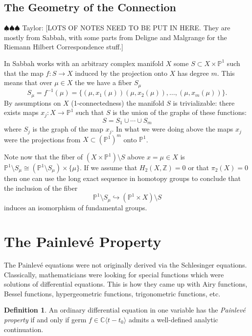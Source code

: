 \documentclass[12pt]{book}
\newcommand{\taylor}[1]{{\color{blue} \sf $\spadesuit\spadesuit\spadesuit$ Taylor: [#1]}}
\numberwithin{equation}{section}
\theoremstyle{definition}
\newtheorem{definition}[theorem]{Definition}
\theoremstyle{remark}
\newcommand{\ZZ}{\mathbb{Z}}
\newcommand{\CC}{\mathbb{C}}
\newcommand{\PP}{\mathbb{P}}
\begin{document}
\subsection{The Geometry of the Connection}

\taylor{LOTS OF NOTES NEED TO BE PUT IN HERE. They are mostly from Sabbah, with some parts from Deligne and Malgrange for the Riemann Hilbert Correspondence stuff.}

In \cite[VI, \S1, pg 192]{Sabbah2007} Sabbah works with an arbitrary complex manifold $X$ some $S \subset X\times \PP^1$ such that the map $f:S \to X$ induced by the projection onto $X$ has degree $m$. 
This means that over $\mu \in X$ the we have a fiber $S_{\mu}$
$$S_{\mu} = f^{-1}(\mu) = \lbrace (\mu,x_1(\mu)) (\mu,x_2(\mu)),\ldots,(\mu,x_m(\mu))\rbrace.$$ 
By assumptions on $X$ (1-connectedness) the manifold $S$ is trivializable: there exists maps $x_j: X \to \PP^1$ such that $S$ is the union of the graphs of these functions:
 $$ S=S_1 \cup \cdots \cup S_m $$
where $S_j$ is the graph of the map $x_j$.
In what we were doing above the maps $x_j$ were the projections from $X\subset (\PP^1)^m$ onto $\PP^1$.

Note now that the fiber of $(X\times \PP^1)\setminus S$ above $x=\mu\in X$ is $\PP^1\setminus S_{\mu} \cong (\PP^1\setminus S_{\mu}) \times \lbrace \mu \rbrace$.
If we assume that $H_2(X,\ZZ)=0$ or that $\pi_2(X)=0$ then one can use the long exact sequence in homotopy groups to conclude that the inclusion of the fiber 
 $$ \PP^1\setminus S_{\mu} \hookrightarrow (\PP^1\times X)\setminus S $$
induces an isomorphism of fundamental groups.

\section{The Painlev\'e Property}
The Painlev\'e equations were not originally derived via the Schlesinger equations. 
Classically, mathematicians were looking for special functions which were solutions of differential equations.
This is how they came up with Airy functions, Bessel functions, hypergeometric functions, trigonometric functions, etc.

\begin{definition}
	An ordinary differential equation in one variable has the \emph{Painlev\'e property} if and only if germ $f\in\CC\langle t-t_0\rangle$ admits a well-defined analytic continuation.
\end{definition}
\end{document}
